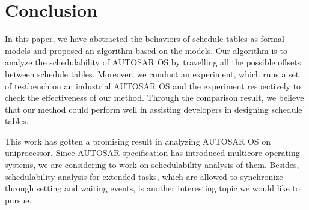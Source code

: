 \documentclass[sigconf]{acmart}
\begin{document}
\section{Conclusion}
In this paper, we have abstracted the behaviors of schedule tables as formal models and proposed an algorithm based on the models. Our algorithm is to analyze the schedulability of AUTOSAR OS by travelling all the possible offsets between schedule tables. Moreover, we conduct an experiment, which runs a set of testbench on an industrial AUTOSAR OS and the experiment respectively to check the effectiveness of our method. Through the comparison result, we believe that our method could perform well in assisting developers in designing schedule tables.
 
This work has gotten a promising result in analyzing AUTOSAR OS on uniprocessor. Since AUTOSAR specification has introduced multicore operating systems, we are considering to work on schedulability analysis of them. Besides, schedulability analysis for extended tasks, which are allowed to synchronize through setting and waiting events, is another interesting topic we would like to pursue.


%


\end{document}
